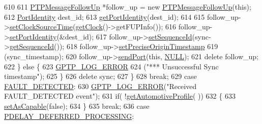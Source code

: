 \begin{DoxyCode}
{{{610 
611                 \hyperlink{class_p_t_p_message_follow_up}{PTPMessageFollowUp} *follow\_up = \textcolor{keyword}{new} 
      \hyperlink{class_p_t_p_message_follow_up}{PTPMessageFollowUp}(\textcolor{keyword}{this});
612                 \hyperlink{class_port_identity}{PortIdentity} dest\_id;
613                 \hyperlink{class_common_port_a563117781330d95f1c6aa43837b7e4ed}{getPortIdentity}(dest\_id);
614 
615                 follow\_up->\hyperlink{class_p_t_p_message_follow_up_a6626c3e5e12de35f2d146e58b24cd742}{setClockSourceTime}(\hyperlink{class_common_port_ab8e59ecfb51ec14e166bc8bfc872b1ef}{getClock}()->getFUPInfo());
616                 follow\_up->\hyperlink{class_p_t_p_message_common_a94378ebb164e2095d3a17b393a63f2dc}{setPortIdentity}(&dest\_id);
617                 follow\_up->\hyperlink{class_p_t_p_message_common_a7fc215800bddc8a39e50e463ffbe651a}{setSequenceId}(sync->\hyperlink{class_p_t_p_message_common_abd5cac5701120cbbfc56129b31fa801f}{getSequenceId}());
618                 follow\_up->\hyperlink{class_p_t_p_message_follow_up_a10fa3138535a8aa4dfd3505418fd9708}{setPreciseOriginTimestamp}
619                     (sync\_timestamp);
620                 follow\_up->\hyperlink{class_p_t_p_message_follow_up_a0c6f07200fa46634360d356ebb10dfe0}{sendPort}(\textcolor{keyword}{this}, \hyperlink{openavb__types__base__pub_8h_a070d2ce7b6bb7e5c05602aa8c308d0c4}{NULL});
621                 \textcolor{keyword}{delete} follow\_up;
622             \} \textcolor{keywordflow}{else} \{
623                 \hyperlink{gptp__log_8hpp_afefbb1009717c128012bfeed94842987}{GPTP\_LOG\_ERROR}
624                     (\textcolor{stringliteral}{"*** Unsuccessful Sync timestamp"});
625             \}
626             \textcolor{keyword}{delete} sync;
627         \}
628         \textcolor{keywordflow}{break};
629     \textcolor{keywordflow}{case} \hyperlink{ieee1588_8hpp_a5667b805d857c6d28f83f6038a0272d3a98cd4e732c656b8c15d078e41109172f}{FAULT\_DETECTED}:
630         \hyperlink{gptp__log_8hpp_afefbb1009717c128012bfeed94842987}{GPTP\_LOG\_ERROR}(\textcolor{stringliteral}{"Received FAULT\_DETECTED event"});
631         \textcolor{keywordflow}{if}( !\hyperlink{class_common_port_ad8dc4b5a985b466538d6805970eb0176}{getAutomotiveProfile}( ))
632         \{
633             \hyperlink{class_common_port_a6f66d6a79abf9ead80338a891ebadcf3}{setAsCapable}(\textcolor{keyword}{false});
634         \}
635         \textcolor{keywordflow}{break};
636     \textcolor{keywordflow}{case} \hyperlink{ieee1588_8hpp_a5667b805d857c6d28f83f6038a0272d3a24255144ef3565ed208dc524d12bbcd1}{PDELAY\_DEFERRED\_PROCESSING}:
}}}
\end{DoxyCode}
